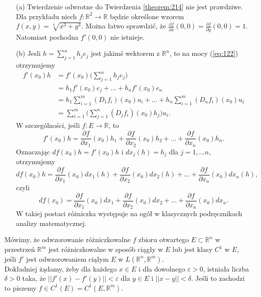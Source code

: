 \documentclass[leqno]{article}
\begin{document}
\begin{justify}
\begin{uwaga}
    \begin{itemize}
        \item [(a)] Twierdzenie odwrotne do Twierdzenia \ref{theorem:214} nie jest prawdziwe. 
            Dla przykładu niech $f : \mathbb{R}^2 \to \mathbb{R}$ będzie określone wzorem $f(x, y) = \sqrt[3]{x^3 + y^3}$.
            Można łatwo sprawdzić, że $\frac{\partial f}{\partial x}(0, 0) = \frac{\partial f}{\partial y}(0,0) = 1$. Natomiast
            pochodna $f'(0, 0)$ nie istnieje.
        \item [(b)]
            Jesli $h = \sum\limits_{j=1}^{n}h_j e_j$ jest jakimś wektorem z $\mathbb{R}^n$, to na mocy (\ref{eq:122}) otrzymujemy 
            \begin{align*}
                f'(x_0)h &= f'(x_0) \Big(\sum_{j=1}^{n}h_j e_j\Big) \\
                        &= h_1 f'(x_0) e_j + \ldots + h_n f'(x_0) e_n \\
                        &= h_1 \sum_{i=1}^{m}(D_1 f_i)(x_0)u_i + \ldots + h_n \sum_{i=1}^{m}(D_n f_i)(x_0)u_i \\
                        &= \sum_{i=1}^{m}\Big(\sum_{j=1}^{n}(D_j f_i)(x_0)h_j\Big)u_i.
            \end{align*}
            W szczególności, jeśli $f : E \to \mathbb{R}$, to 
            \[
                f'(x_0)h = \frac{\partial f}{\partial x_1}(x_0) h _1 + \frac{\partial f}{\partial x_2}(x_0)h_2 + \ldots + \frac{\partial f}{\partial x_n}(x_0)h_n.
            \]
            Oznaczając $df(x_0)h = f'(x_0)h$ i $dx_j(h) = h_j$ dla $j = 1, \ldots n$, otrzymujemy 
            \[
                df(x_0)h = \frac{\partial f}{\partial x_1}(x_0) dx_1(h) + \frac{\partial f}{\partial x_2}(x_0) dx_2(h) + \ldots + \frac{\partial f}{\partial x_n}(x_0) dx_n(h),
            \]
            czyli 
            \[
                df(x_0) = \frac{\partial f}{\partial x_1}(x_0) dx_1 + \frac{\partial f}{\partial x_2}(x_0) dx_2 + \ldots + \frac{\partial f}{\partial x_n}(x_0) dx_n.
            \]
            W takiej postaci różniczka występuje na ogół w klasycznych podręcznikach analizy matematycznej.
    \end{itemize}
\end{uwaga}

\begin{defn}
    Mówimy, że odwzorowanie różniczkowalne $f$ zbioru otwartego $E \subset \mathbb{R}^n$ w przestrzeń $\mathbb{R}^m$ jest różniczkowalne w sposób ciągły w $E$ lub jest klasy $C^1$ w $E$, jeśli $f'$ jest odwzorowaniem ciąłym $E$ w $L(\mathbb{R}^n, \mathbb{R}^m)$. \\
    Dokładniej żądamy, żeby dla każdego $x \in E$ i dla dowolnego $\varepsilon > 0$, istniała liczba $\delta > 0$ taka, że $||f'(x) - f'(y)|| < \varepsilon$
    dla $y \in E$ i $||x - y|| < \delta$. Jeśli to zachodzi to piszemy $f \in C^1(E) = C^1(E, \mathbb{R}^m)$.
\end{defn}


\end{justify}
\end{document}
